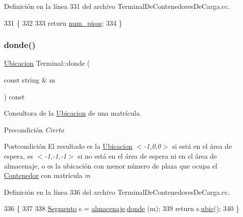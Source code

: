 Definición en la línea 331 del archivo Terminal\+De\+Contenedores\+De\+Carga.\+cc.


\begin{DoxyCode}
331                           \{
332     
333     \textcolor{keywordflow}{return} \hyperlink{class_terminal_ad6cdee7fe26b4443d45b0a18c345a86d}{num\_pisos};
334 \}
\end{DoxyCode}
\mbox{\label{class_terminal_a2847cb58fe61bb488f089bc67a1973fe}} 
\subsubsection{\texorpdfstring{donde()}{donde()}}
{\footnotesize\ttfamily \hyperlink{class_ubicacion}{Ubicacion} Terminal\+::donde (\begin{DoxyParamCaption}\item[{const string \&}]{m }\end{DoxyParamCaption}) const}



Consultora de la \hyperlink{class_ubicacion}{Ubicacion} de una matrícula. 

\begin{DoxyPrecond}{Precondición}
{\itshape Cierto} 
\end{DoxyPrecond}
\begin{DoxyPostcond}{Postcondición}
El resultado es la \hyperlink{class_ubicacion}{Ubicacion} $<${\itshape -\/1},{\itshape 0},{\itshape 0}$>$ si está en el área de espera, es $<${\itshape -\/1},{\itshape -\/1},{\itshape -\/1}$>$ si no está en el área de espera ni en el área de almacenaje, o es la ubicación con menor número de plaza que ocupa el \hyperlink{class_contenedor}{Contenedor} con matrícula {\itshape m} 
\end{DoxyPostcond}


Definición en la línea 336 del archivo Terminal\+De\+Contenedores\+De\+Carga.\+cc.


\begin{DoxyCode}
336                                                 \{
337     
338     \hyperlink{class_segmento}{Segmento} s = \hyperlink{class_terminal_a1d87d7b16c4f460eee6f1ab73da90fd2}{almacenaje}.\hyperlink{class_almacenaje_afe08e4bca255d4baf3750019622e6cb2}{donde} (m);
339     \textcolor{keywordflow}{return} s.\hyperlink{class_segmento_aeb7bfd4dcac3a1a000a33582861e0d50}{ubic}();
340 \}
\end{DoxyCode}
\mbox{\label{class_terminal_afc6d0f22bcc642c6ac4355e0b02a7d79}} 
